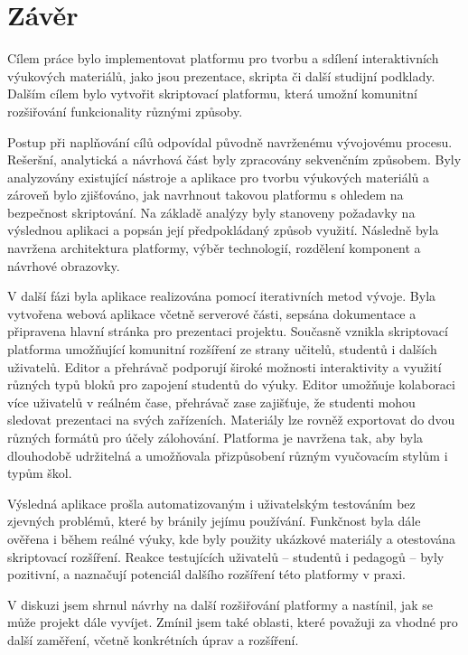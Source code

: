 \chapter*{Závěr}


Cílem práce bylo implementovat platformu pro tvorbu a sdílení interaktivních výukových materiálů, jako jsou prezentace, skripta či další studijní podklady. 
Dalším cílem bylo vytvořit skriptovací platformu, která umožní komunitní rozšiřování funkcionality různými způsoby.

Postup při naplňování cílů odpovídal původně navrženému vývojovému procesu. Rešeršní, analytická a návrhová část byly zpracovány sekvenčním způsobem. 
Byly analyzovány existující nástroje a aplikace pro tvorbu výukových materiálů a zároveň bylo zjišťováno, jak navrhnout takovou platformu s ohledem na bezpečnost skriptování.
Na základě analýzy byly stanoveny požadavky na výslednou aplikaci a popsán její předpokládaný způsob využití. 
Následně byla navržena architektura platformy, výběr technologií, rozdělení komponent a návrhové obrazovky.

V další fázi byla aplikace realizována pomocí iterativních metod vývoje.
Byla vytvořena webová aplikace včetně serverové části, sepsána dokumentace a připravena hlavní stránka pro prezentaci projektu.
Současně vznikla skriptovací platforma umožňující komunitní rozšíření ze strany učitelů, studentů i dalších uživatelů.
Editor a přehrávač podporují široké možnosti interaktivity a využití různých typů bloků pro zapojení studentů do výuky. 
Editor umožňuje kolaboraci více uživatelů v reálném čase, přehrávač zase zajišťuje, že studenti mohou sledovat prezentaci na svých zařízeních.
Materiály lze rovněž exportovat do dvou různých formátů pro účely zálohování. Platforma je navržena tak, aby byla dlouhodobě udržitelná a umožňovala přizpůsobení různým vyučovacím stylům i typům škol.

Výsledná aplikace prošla automatizovaným i uživatelským testováním bez zjevných problémů, které by bránily jejímu používání. 
Funkčnost byla dále ověřena i během reálné výuky, kde byly použity ukázkové materiály a otestována skriptovací rozšíření. 
Reakce testujících uživatelů -- studentů i pedagogů -- byly pozitivní, a naznačují potenciál dalšího rozšíření této platformy v praxi.

V diskuzi jsem shrnul návrhy na další rozšiřování platformy a nastínil, jak se může projekt dále vyvíjet. 
Zmínil jsem také oblasti, které považuji za vhodné pro další zaměření, včetně konkrétních úprav a rozšíření. 


